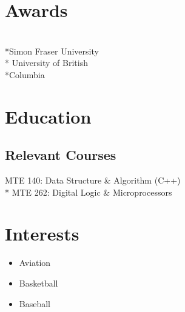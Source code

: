 \documentclass[]{morris-cv}
\begin{document}
\begin{minipage}[t]{0.25\textwidth}
\section{Awards}
\\*Simon Fraser University 
\bigskip
\def\nespace{\hskip\fontdimen2\font\relax}
\\* University of British \\*Columbia


\section{Education}
\subsection{Relevant Courses}
MTE 140: Data Structure \& Algorithm (C++)
\bigskip
\\* MTE 262:  Digital Logic \& Microprocessors

\section {Interests}
\begin{itemize}
    \setlength\itemsep{-0.2em}
        \item Aviation
        \item Basketball
        \item Baseball
\end{itemize}
\sectionsep

%
%

\end{minipage} 
\end{document}
